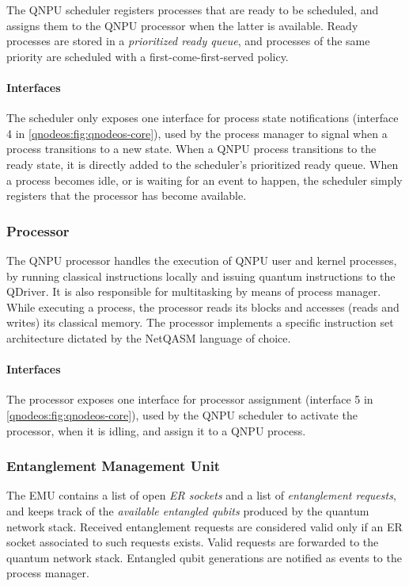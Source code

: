 The \ac{QNPU} scheduler registers processes that are ready to be scheduled, and assigns them to the \ac{QNPU} processor when the latter is available. Ready processes are stored in a \emph{prioritized ready queue}, and processes of the same priority are scheduled with a first-come-first-served policy.

\paragraph{Interfaces}

The scheduler only exposes one interface for process state notifications (interface 4 in \cref{qnodeos:fig:qnodeos-core}), used by the process manager to signal when a process transitions to a new state. When a \ac{QNPU} process transitions to the ready state, it is directly added to the scheduler's prioritized ready queue. When a process becomes idle, or is waiting for an event to happen, the scheduler simply registers that the processor has become available.

\subsubsection{Processor}

The \ac{QNPU} processor handles the execution of \ac{QNPU} user and kernel processes, by running classical instructions locally and issuing quantum instructions to the \ac{QDriver}. It is also responsible for multitasking by means of process manager. While executing a process, the processor reads its blocks and accesses (reads and writes) its classical memory. The processor implements a specific instruction set architecture dictated by the \ac{NetQASM} language of choice.

\paragraph{Interfaces}

The processor exposes one interface for processor assignment (interface 5 in \cref{qnodeos:fig:qnodeos-core}), used by the \ac{QNPU} scheduler to activate the processor, when it is idling, and assign it to a \ac{QNPU} process.

\subsubsection{Entanglement Management Unit}

The \acf{EMU} contains a list of open \emph{\ac{ER} sockets} and a list of \emph{entanglement requests}, and keeps track of the \emph{available entangled qubits} produced by the quantum network stack. Received entanglement requests are considered valid only if an \ac{ER} socket associated to such requests exists. Valid requests are forwarded to the quantum network stack. Entangled qubit generations are notified as events to the process manager.

